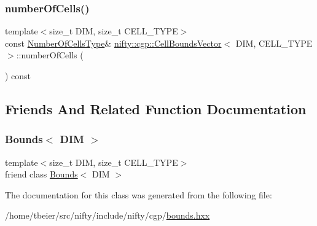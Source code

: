 \subsubsection{\texorpdfstring{number\+Of\+Cells()}{numberOfCells()}}
{\footnotesize\ttfamily template$<$size\+\_\+t D\+IM, size\+\_\+t C\+E\+L\+L\+\_\+\+T\+Y\+PE$>$ \\
const \hyperlink{classnifty_1_1cgp_1_1CellBoundsVector_a4db6e267b7ec9e9bfd2db914354c49f9}{Number\+Of\+Cells\+Type}\& \hyperlink{classnifty_1_1cgp_1_1CellBoundsVector}{nifty\+::cgp\+::\+Cell\+Bounds\+Vector}$<$ D\+IM, C\+E\+L\+L\+\_\+\+T\+Y\+PE $>$\+::number\+Of\+Cells (\begin{DoxyParamCaption}{ }\end{DoxyParamCaption}) const\hspace{0.3cm}{\ttfamily [inline]}}



\subsection{Friends And Related Function Documentation}
\mbox{\label{classnifty_1_1cgp_1_1CellBoundsVector_a88cb0f4daae12ff33da3c2a17786cd08}} 
\subsubsection{\texorpdfstring{Bounds$<$ D\+I\+M $>$}{Bounds< DIM >}}
{\footnotesize\ttfamily template$<$size\+\_\+t D\+IM, size\+\_\+t C\+E\+L\+L\+\_\+\+T\+Y\+PE$>$ \\
friend class \hyperlink{classnifty_1_1cgp_1_1Bounds}{Bounds}$<$ D\+IM $>$\hspace{0.3cm}{\ttfamily [friend]}}



The documentation for this class was generated from the following file\+:\begin{DoxyCompactItemize}
\item 
/home/tbeier/src/nifty/include/nifty/cgp/\hyperlink{bounds_8hxx}{bounds.\+hxx}\end{DoxyCompactItemize}
